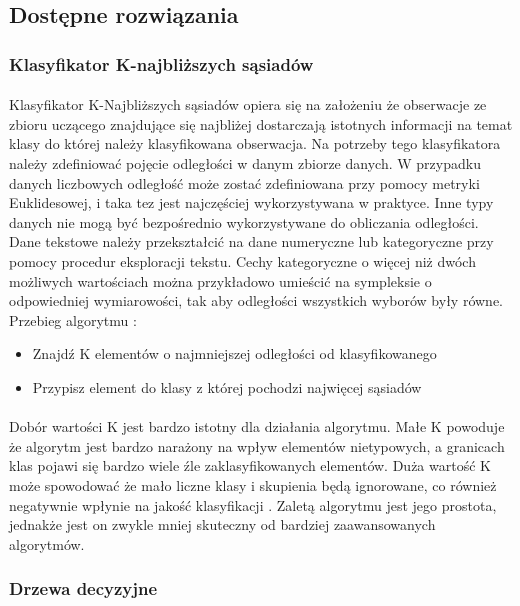 \documentclass[a4paper,12pt,twoside]{article}
\begin{document}
\subsection{Dostępne rozwiązania}
\subsubsection{Klasyfikator K-najbliższych sąsiadów}
\paragraph{}
Klasyfikator K-Najbliższych sąsiadów opiera się na założeniu że obserwacje ze zbioru uczącego znajdujące się najbliżej dostarczają istotnych informacji na temat klasy do której należy klasyfikowana obserwacja. Na potrzeby tego klasyfikatora należy zdefiniować pojęcie odległości w danym zbiorze danych. W przypadku danych liczbowych odległość może zostać zdefiniowana przy pomocy metryki Euklidesowej, i taka tez jest najczęściej wykorzystywana w praktyce. Inne typy danych nie mogą być bezpośrednio wykorzystywane do obliczania odległości. Dane tekstowe należy przekształcić na dane numeryczne lub kategoryczne przy pomocy procedur eksploracji tekstu. Cechy kategoryczne o więcej niż dwóch możliwych wartościach można przykładowo umieścić na sympleksie o odpowiedniej wymiarowości, tak aby odległości wszystkich wyborów były równe. Przebieg algorytmu \cite{knn}:
\begin{itemize}
\item Znajdź K elementów o najmniejszej odległości od klasyfikowanego
\item Przypisz element do klasy z której pochodzi najwięcej sąsiadów
\end{itemize} 
\paragraph{}
Dobór wartości K jest bardzo istotny dla działania algorytmu. Małe K powoduje że algorytm jest bardzo narażony na wpływ elementów nietypowych, a granicach klas pojawi się bardzo wiele źle zaklasyfikowanych elementów.  Duża wartość K może spowodować że mało liczne klasy i skupienia będą ignorowane, co również negatywnie wpłynie na jakość klasyfikacji \cite{knn}. Zaletą algorytmu jest jego prostota, jednakże jest on zwykle mniej skuteczny od bardziej zaawansowanych algorytmów.
\newpage
\subsubsection{Drzewa decyzyjne}
\end{document}
